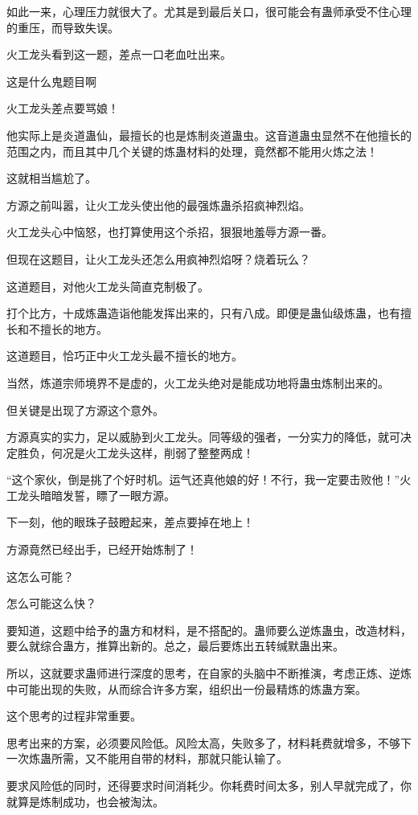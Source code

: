 \begin{this_body}
如此一来，心理压力就很大了。尤其是到最后关口，很可能会有蛊师承受不住心理的重压，而导致失误。

火工龙头看到这一题，差点一口老血吐出来。

这是什么鬼题目啊

火工龙头差点要骂娘！

他实际上是炎道蛊仙，最擅长的也是炼制炎道蛊虫。这音道蛊虫显然不在他擅长的范围之内，而且其中几个关键的炼蛊材料的处理，竟然都不能用火炼之法！

这就相当尴尬了。

方源之前叫嚣，让火工龙头使出他的最强炼蛊杀招疯神烈焰。

火工龙头心中恼怒，也打算使用这个杀招，狠狠地羞辱方源一番。

但现在这题目，让火工龙头还怎么用疯神烈焰呀？烧着玩么？

这道题目，对他火工龙头简直克制极了。

打个比方，十成炼蛊造诣他能发挥出来的，只有八成。即便是蛊仙级炼蛊，也有擅长和不擅长的地方。

这道题目，恰巧正中火工龙头最不擅长的地方。

当然，炼道宗师境界不是虚的，火工龙头绝对是能成功地将蛊虫炼制出来的。

但关键是出现了方源这个意外。

方源真实的实力，足以威胁到火工龙头。同等级的强者，一分实力的降低，就可决定胜负，何况是火工龙头这样，削弱了整整两成！

“这个家伙，倒是挑了个好时机。运气还真他娘的好！不行，我一定要击败他！”火工龙头暗暗发誓，瞟了一眼方源。

下一刻，他的眼珠子鼓瞪起来，差点要掉在地上！

方源竟然已经出手，已经开始炼制了！

这怎么可能？

怎么可能这么快？

要知道，这题中给予的蛊方和材料，是不搭配的。蛊师要么逆炼蛊虫，改造材料，要么就综合蛊方，推算出新的。总之，最后要炼出五转缄默蛊出来。

所以，这就要求蛊师进行深度的思考，在自家的头脑中不断推演，考虑正炼、逆炼中可能出现的失败，从而综合许多方案，组织出一份最精炼的炼蛊方案。

这个思考的过程非常重要。

思考出来的方案，必须要风险低。风险太高，失败多了，材料耗费就增多，不够下一次炼蛊所需，又不能用自带的材料，那就只能认输了。

要求风险低的同时，还得要求时间消耗少。你耗费时间太多，别人早就完成了，你就算是炼制成功，也会被淘汰。


\end{this_body}
